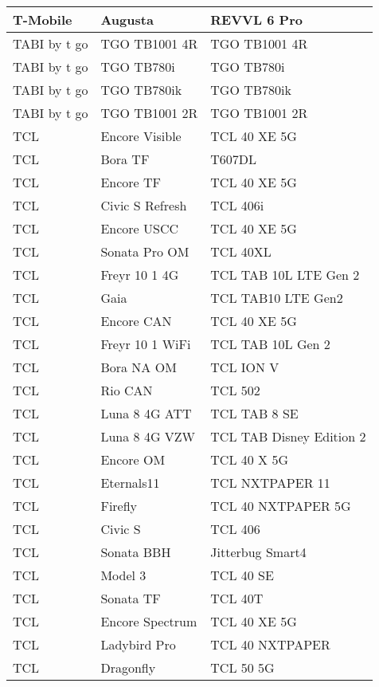 \begin{tabularx}{\linewidth}{|l|X|X|}
        T-Mobile & Augusta & REVVL 6 Pro \\ \hline
        TABI by t go & TGO TB1001 4R & TGO TB1001 4R \\ \hline
        TABI by t go & TGO TB780i & TGO TB780i \\ \hline
        TABI by t go & TGO TB780ik & TGO TB780ik \\ \hline
        TABI by t go & TGO TB1001 2R & TGO TB1001 2R \\ \hline
        TCL & Encore Visible & TCL 40 XE 5G \\ \hline
        TCL & Bora TF & T607DL \\ \hline
        TCL & Encore TF & TCL 40 XE 5G \\ \hline
        TCL & Civic S Refresh & TCL 406i \\ \hline
        TCL & Encore USCC & TCL 40 XE 5G \\ \hline
        TCL & Sonata Pro OM & TCL 40XL \\ \hline
        TCL & Freyr 10 1 4G & TCL TAB 10L LTE Gen 2 \\ \hline
        TCL & Gaia & TCL TAB10 LTE Gen2 \\ \hline
        TCL & Encore CAN & TCL 40 XE 5G \\ \hline
        TCL & Freyr 10 1 WiFi & TCL TAB 10L Gen 2 \\ \hline
        TCL & Bora NA OM & TCL ION V \\ \hline
        TCL & Rio CAN & TCL 502 \\ \hline
        TCL & Luna 8 4G ATT & TCL TAB 8 SE \\ \hline
        TCL & Luna 8 4G VZW & TCL TAB Disney Edition 2 \\ \hline
        TCL & Encore OM & TCL 40 X 5G \\ \hline
        TCL & Eternals11 & TCL NXTPAPER 11 \\ \hline
        TCL & Firefly & TCL 40 NXTPAPER 5G \\ \hline
        TCL & Civic S & TCL 406 \\ \hline
        TCL & Sonata BBH & Jitterbug Smart4 \\ \hline
        TCL & Model 3 & TCL 40 SE \\ \hline
        TCL & Sonata TF & TCL 40T \\ \hline
        TCL & Encore Spectrum & TCL 40 XE 5G \\ \hline
        TCL & Ladybird Pro & TCL 40 NXTPAPER \\ \hline
        TCL & Dragonfly & TCL 50 5G \\ \hline

\end{tabularx}
